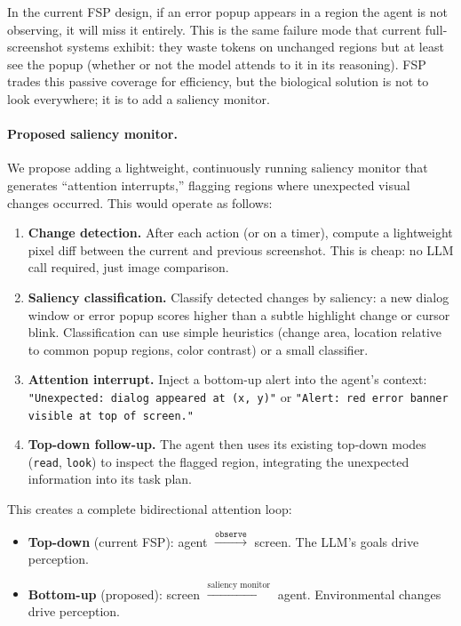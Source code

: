 \documentclass[11pt,a4paper]{article}
\begin{document}
In the current FSP design, if an error popup appears in a region the agent is not observing, it will miss it entirely. This is the same failure mode that current full-screenshot systems exhibit: they waste tokens on unchanged regions but at least see the popup (whether or not the model attends to it in its reasoning). FSP trades this passive coverage for efficiency, but the biological solution is not to look everywhere; it is to add a saliency monitor.

\paragraph{Proposed saliency monitor.}
We propose adding a lightweight, continuously running saliency monitor that generates ``attention interrupts,'' flagging regions where unexpected visual changes occurred. This would operate as follows:

\begin{enumerate}
    \item \textbf{Change detection.} After each action (or on a timer), compute a lightweight pixel diff between the current and previous screenshot. This is cheap: no LLM call required, just image comparison.
    \item \textbf{Saliency classification.} Classify detected changes by saliency: a new dialog window or error popup scores higher than a subtle highlight change or cursor blink. Classification can use simple heuristics (change area, location relative to common popup regions, color contrast) or a small classifier.
    \item \textbf{Attention interrupt.} Inject a bottom-up alert into the agent's context: \texttt{"Unexpected: dialog appeared at (x, y)"} or \texttt{"Alert: red error banner visible at top of screen."}
    \item \textbf{Top-down follow-up.} The agent then uses its existing top-down modes (\texttt{read}, \texttt{look}) to inspect the flagged region, integrating the unexpected information into its task plan.
\end{enumerate}

This creates a complete bidirectional attention loop:

\begin{itemize}
    \item \textbf{Top-down} (current FSP): agent $\xrightarrow{\texttt{observe}}$ screen. The LLM's goals drive perception.
    \item \textbf{Bottom-up} (proposed): screen $\xrightarrow{\text{saliency monitor}}$ agent. Environmental changes drive perception.
\end{itemize}
\end{document}
